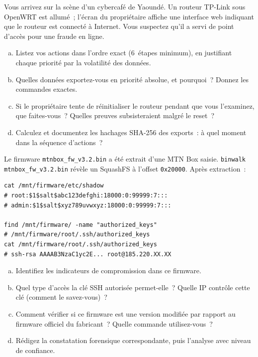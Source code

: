 \bigskip

\begin{boxexo}[title={\ding{45}\quad Exercice~18.1. Priorité de collecte IoT \niveaubase}]
Vous arrivez sur la scène d'un cybercafé de Yaoundé. Un routeur TP-Link
sous OpenWRT est allumé~; l'écran du propriétaire affiche une interface
web indiquant que le routeur est connecté à Internet. Vous suspectez
qu'il a servi de point d'accès pour une fraude en ligne.
\begin{enumerate}[(a)]
    \item Listez vos actions dans l'ordre exact (6~étapes minimum),
          en justifiant chaque priorité par la volatilité des données.
    \item Quelles données exportez-vous en priorité absolue, et
          pourquoi~? Donnez les commandes exactes.
    \item Si le propriétaire tente de réinitialiser le routeur
          pendant que vous l'examinez, que faites-vous~? Quelles
          preuves subsisteraient malgré le reset~?
    \item Calculez et documentez les hachages SHA-256 des
          exports~: à quel moment dans la séquence d'actions~?
\end{enumerate}
\end{boxexo}

\begin{boxexo}[title={\ding{45}\quad Exercice~18.2. Analyse firmware \niveaumoyen}]
Le firmware \texttt{mtnbox\_fw\_v3.2.bin} a été extrait d'une MTN Box
saisie. \texttt{binwalk mtnbox\_fw\_v3.2.bin} révèle un SquashFS à
l'offset \texttt{0x20000}. Après extraction~:
\begin{lstlisting}[language=bash_forensique]
cat /mnt/firmware/etc/shadow
# root:$1$salt$abc123defghi:18000:0:99999:7:::
# admin:$1$salt$xyz789uvwxyz:18000:0:99999:7:::

find /mnt/firmware/ -name "authorized_keys"
# /mnt/firmware/root/.ssh/authorized_keys
cat /mnt/firmware/root/.ssh/authorized_keys
# ssh-rsa AAAAB3NzaC1yc2E... root@185.220.XX.XX
\end{lstlisting}
\begin{enumerate}[(a)]
    \item Identifiez les indicateurs de compromission dans ce firmware.
    \item Quel type d'accès la clé SSH autorisée permet-elle~?
          Quelle IP contrôle cette clé (comment le savez-vous)~?
    \item Comment vérifier si ce firmware est une version modifiée
          par rapport au firmware officiel du fabricant~? Quelle
          commande utilisez-vous~?
    \item Rédigez la constatation forensique correspondante, puis
          l'analyse avec niveau de confiance.
\end{enumerate}
\end{boxexo}

